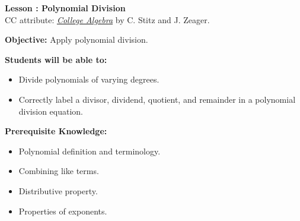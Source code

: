 \documentclass[12pt]{article}
\theoremstyle{definition}
\begin{document}
{\bf \large Lesson : Polynomial Division}\label{les:polynomial_division}
\\ CC attribute: \href{http://www.stitz-zeager.com}{\it{College Algebra}} by C. Stitz and J. Zeager. 
\hfill \doclicenseImage[imagewidth=5em]\\
\par
{\bf Objective:} Apply polynomial division.\\
\par
{\bf Students will be able to:}
\begin{itemize}
	\item Divide polynomials of varying degrees.  
	\item Correctly label a divisor, dividend, quotient, and remainder in a polynomial division equation.
\end{itemize}
{\bf Prerequisite Knowledge:}
\begin{itemize}
	\item Polynomial definition and terminology.
	\item Combining like terms.
	\item Distributive property.
	\item Properties of exponents.
\end{itemize}
\hrulefill
\end{document}
